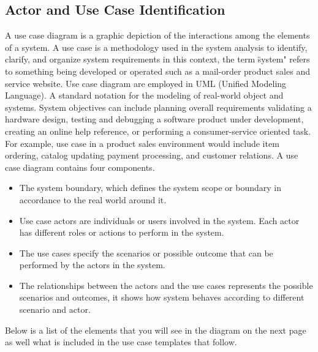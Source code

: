 \subsection{Actor and Use Case Identification}
A use case diagram is a graphic depiction of the interactions among the elements of a system. A use case is a methodology used in the system analysis to identify, clarify, and organize system requirements in this context, the term \"system" refers to something being developed or operated such as a mail-order product sales and service website. Use case diagram are employed in UML (Unified Modeling Language). A standard notation for the modeling of real-world object and systems. System objectives can include planning overall requirements validating a hardware design, testing and debugging a software product under development, creating an online help reference, or performing a consumer-service oriented task. For example, use case in a product sales environment would include item ordering, catalog updating payment processing, and customer relations. A use case diagram contains four components.
\begin{itemize}
	\item The system boundary, which defines the system scope or boundary in accordance to
the real world around it.
	\item Use case actors are individuals or users involved in the system. Each actor has
different roles or actions to perform in the system.
	\item The use cases specify the scenarios or possible outcome that can be performed by
the actors in the system.
	\item The relationships between the actors and the use cases represents the possible
scenarios and outcomes, it shows how system behaves according to different scenario
and actor.
\end{itemize}

Below is a list of the elements that you will see in the diagram on the next page as well what is included in the use case templates that follow. 

